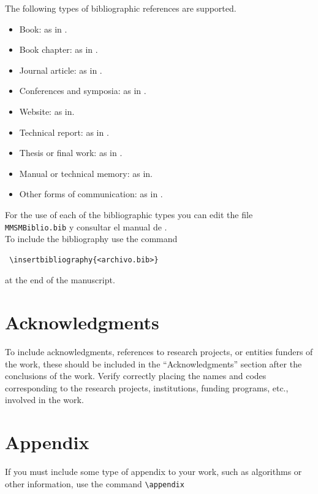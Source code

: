 \documentclass[eng]{MMSB-class-eng}
\begin{document}
The following types of bibliographic references are supported.
\begin{itemize}
 \item Book: as in \citep{Murray2007}.
 \item Book chapter: as in  \citep{Jones2009}.
 \item Journal article: as in \citep{Volterra1929}.
 \item Conferences and symposia: as in \citep{BarkovaJouvet1999}.
 \item Website: as in\citep{lopez2006guia}.
 \item Technical report: as in \citep{NACA460}.
 \item Thesis or final work: as in \citep{Krause2014}.
 \item Manual or technical memory: as in\citep{Indura2010}.
 \item Other forms of communication: as in \citep{Radio2015}.
\end{itemize}

For the use of each of the bibliographic types you can edit the file \texttt{MMSMBiblio.bib} y consultar el manual de \citep{lopez2006guia}.\\

To include the bibliography use the command
\begin{verbatim}
 \insertbibliography{<archivo.bib>} 
\end{verbatim}
at the end of the manuscript.

\section{Acknowledgments}
To include acknowledgments, references to research projects, or entities
funders of the work, these should be included in the ``Acknowledgments'' section after the conclusions of the work.
Verify correctly placing the names and codes corresponding to the research projects, institutions, funding programs, etc., involved in the work.

\appendix
\section{Appendix}
If you must include some type of appendix to your work, such as algorithms or other information, use the command \verb!\appendix!


\end{document}
